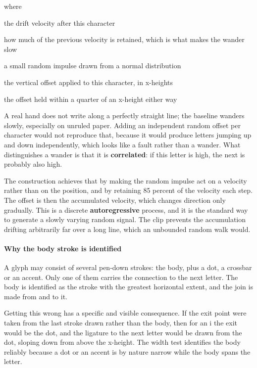 \noindent where
\begin{description}[leftmargin=2.4em,style=nextline,font=\normalfont\ttfamily]\setlength\itemsep{1pt}
  \item[{$v_t$}] \normalfont the drift velocity after this character
  \item[{$0.85$}] \normalfont how much of the previous velocity is retained, which is what makes the wander slow
  \item[{$\eta_t$}] \normalfont a small random impulse drawn from a normal distribution
  \item[{$\mathrm{drift}_t$}] \normalfont the vertical offset applied to this character, in x-heights
  \item[{$\mathrm{clip}(\cdot,-0.25,0.25)$}] \normalfont the offset held within a quarter of an x-height either way
\end{description}
A real hand does not write along a perfectly straight line; the baseline wanders slowly, especially on unruled paper. Adding an independent random offset per character would not reproduce that, because it would produce letters jumping up and down independently, which looks like a fault rather than a wander. What distinguishes a wander is that it is \textbf{correlated}: if this letter is high, the next is probably also high.

The construction achieves that by making the random impulse act on a velocity rather than on the position, and by retaining 85 percent of the velocity each step. The offset is then the accumulated velocity, which changes direction only gradually. This is a discrete \textbf{autoregressive} process, and it is the standard way to generate a slowly varying random signal. The clip prevents the accumulation drifting arbitrarily far over a long line, which an unbounded random walk would.


\paragraph{Why the body stroke is identified}
A glyph may consist of several pen-down strokes: the body, plus a dot, a crossbar or an accent. Only one of them carries the connection to the next letter. The body is identified as the stroke with the greatest horizontal extent, and the join is made from and to it.

Getting this wrong has a specific and visible consequence. If the exit point were taken from the last stroke drawn rather than the body, then for an i the exit would be the dot, and the ligature to the next letter would be drawn from the dot, sloping down from above the x-height. The width test identifies the body reliably because a dot or an accent is by nature narrow while the body spans the letter.


